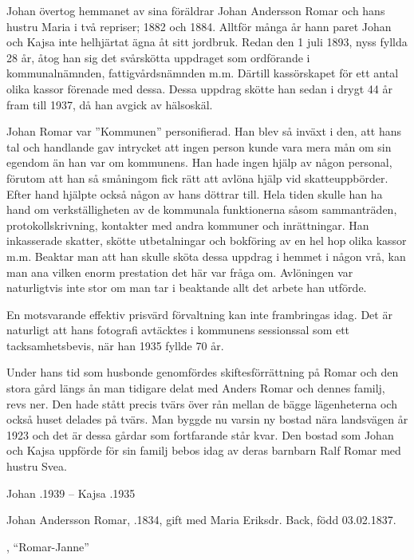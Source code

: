Johan övertog hemmanet av sina föräldrar Johan Andersson Romar och hans hustru Maria i två repriser;  1882 och 1884. Alltför många år hann paret Johan och Kajsa inte helhjärtat ägna åt sitt jordbruk. Redan den 1 juli 1893, nyss fyllda 28 år, åtog han sig det svårskötta uppdraget som ordförande i kommunalnämnden, fattigvårdsnämnden m.m. Därtill kassörskapet för ett antal olika kassor förenade med dessa. Dessa uppdrag skötte han sedan i drygt 44 år fram till 1937, då han avgick av hälsoskäl.

Johan Romar var ”Kommunen” personifierad. Han blev så inväxt i den, att hans tal och handlande gav intrycket att ingen person kunde vara mera mån om sin egendom än han var om kommunens. Han hade ingen hjälp av någon personal, förutom  att han så småningom fick rätt att avlöna hjälp vid skatteuppbörder. Efter hand hjälpte också någon av hans döttrar till. Hela tiden skulle han ha hand om verkställigheten av de kommunala funktionerna såsom sammanträden, protokollskrivning, kontakter med andra kommuner och inrättningar. Han inkasserade skatter, skötte utbetalningar och bokföring av en hel hop olika kassor m.m. Beaktar man att han skulle sköta dessa uppdrag i hemmet i någon vrå, kan man ana vilken enorm prestation det här var fråga om. Avlöningen var naturligtvis inte stor om man tar i beaktande allt det arbete han utförde.

En motsvarande effektiv prisvärd förvaltning kan inte frambringas idag. Det är naturligt att hans fotografi avtäcktes i kommunens sessionssal som ett tacksamhetsbevis, när han 1935 fyllde 70 år.

Under hans tid som husbonde genomfördes skiftesförrättning på Romar och den stora gård längs ån man tidigare delat med Anders Romar och dennes familj, revs ner. Den hade stått precis tvärs över rån mellan de bägge lägenheterna och också huset delades på tvärs. Man byggde nu varsin ny bostad nära landsvägen år 1923 och det är dessa gårdar som fortfarande står kvar. Den bostad som Johan och Kajsa uppförde för sin familj bebos idag av deras barnbarn Ralf Romar med hustru Svea.

Johan .1939  --  Kajsa .1935




Johan Andersson Romar, .1834, gift med Maria Eriksdr. Back, \textborn född 03.02.1837.
\begin{jhchildren}
  \item {}
  \item {}, ``Romar-Janne''
  \item {}
\end{jhchildren}

